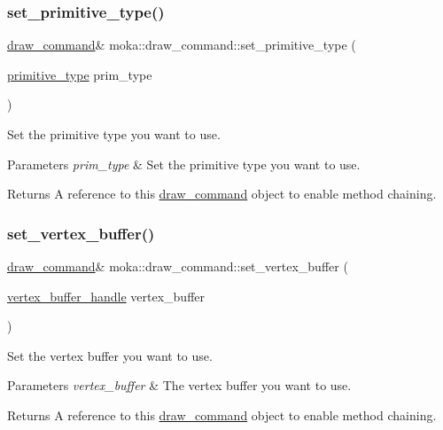 \subsubsection{\texorpdfstring{set\_primitive\_type()}{set\_primitive\_type()}}
{\footnotesize\ttfamily \mbox{\hyperlink{classmoka_1_1draw__command}{draw\+\_\+command}}\& moka\+::draw\+\_\+command\+::set\+\_\+primitive\+\_\+type (\begin{DoxyParamCaption}\item[{\mbox{\hyperlink{namespacemoka_a345d155429e260a6344f9c555f04ae9c}{primitive\+\_\+type}}}]{prim\+\_\+type }\end{DoxyParamCaption})}



Set the primitive type you want to use. 


\begin{DoxyParams}{Parameters}
{\em prim\+\_\+type} & Set the primitive type you want to use. \\
\hline
\end{DoxyParams}
\begin{DoxyReturn}{Returns}
A reference to this \mbox{\hyperlink{classmoka_1_1draw__command}{draw\+\_\+command}} object to enable method chaining. 
\end{DoxyReturn}
\mbox{\label{classmoka_1_1draw__command_af6b7448828b6ab837d25716e8a80acdc}} 
\subsubsection{\texorpdfstring{set\_vertex\_buffer()}{set\_vertex\_buffer()}}
{\footnotesize\ttfamily \mbox{\hyperlink{classmoka_1_1draw__command}{draw\+\_\+command}}\& moka\+::draw\+\_\+command\+::set\+\_\+vertex\+\_\+buffer (\begin{DoxyParamCaption}\item[{\mbox{\hyperlink{structmoka_1_1vertex__buffer__handle}{vertex\+\_\+buffer\+\_\+handle}}}]{vertex\+\_\+buffer }\end{DoxyParamCaption})}



Set the vertex buffer you want to use. 


\begin{DoxyParams}{Parameters}
{\em vertex\+\_\+buffer} & The vertex buffer you want to use. \\
\hline
\end{DoxyParams}
\begin{DoxyReturn}{Returns}
A reference to this \mbox{\hyperlink{classmoka_1_1draw__command}{draw\+\_\+command}} object to enable method chaining. 
\end{DoxyReturn}
\mbox{\label{classmoka_1_1draw__command_a383256cec501b03d6e7aaa67631c7687}} 
